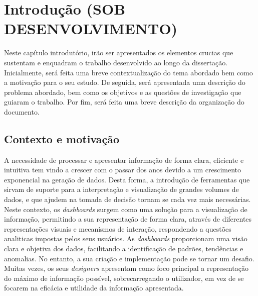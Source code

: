 
%

\chapter{Introdução (SOB DESENVOLVIMENTO)}
\label{cha:introducao}

Neste capítulo introdutório, irão ser apresentados os elementos crucias que sustentam e enquadram o trabalho desenvolvido ao longo da dissertação. Inicialmente, será feita uma breve contextualização do tema abordado bem como a motivação para o seu estudo. De seguida, será apresentada uma descrição do problema abordado, bem como os objetivos e as questões de investigação que guiaram o trabalho. Por fim, será feita uma breve descrição da organização do documento.

\section{Contexto e motivação}
\label{sec:cont_e_motiv}

A necessidade de processar e apresentar informação de forma clara, eficiente e intuitiva tem vindo a crescer com o passar dos anos devido a um crescimento exponencial na geração de dados. Desta forma, a introdução de ferramentas que sirvam de suporte para a interpretação e visualização de grandes volumes de dados, e que ajudem na tomada de decisão tornam se cada vez mais necessárias. Neste contexto, os \textit{dashboards} surgem como uma solução para a visualização de informação, permitindo a sua representação de forma clara, através de diferentes representações visuais e mecanismos de interação, respondendo a questões analiticas impostas pelos seus usuários. As \textit{dashboards} proporcionam uma visão clara e objetiva dos dados, facilitando a identificação de padrões, tendências e anomalias. No entanto, a sua criação e implementação pode se tornar um desafio. Muitas vezes, os seus \textit{designers} apresentam como foco principal a representação do máximo de informação possível, sobrecarregando o utilizador, em vez de se focarem na eficácia e utilidade da informação apresentada.

